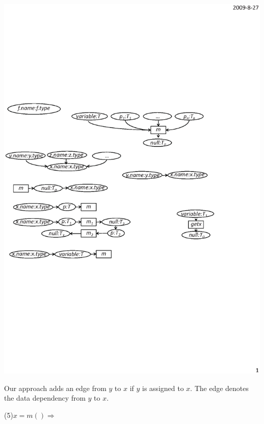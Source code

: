 \begin{center}
\includegraphics[scale=0.7,clip]{figure/rule4.eps}%
\end{center}

Our approach adds an edge from $y$ to $x$ if $y$ is assigned to $x$.
The edge denotes the data dependency from $y$ to $x$.

(5)$x=m() \Rightarrow $

